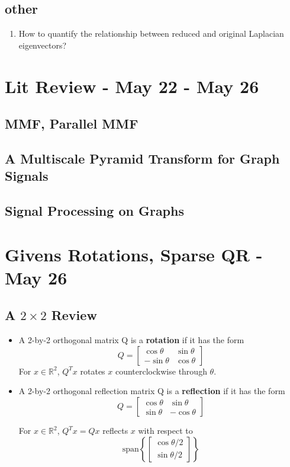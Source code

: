\documentclass[a4paper]{article}
\newcommand{\R}{\mathbb{R}}
\begin{document}
\subsection{other}
\begin{enumerate}
\item How to quantify the relationship between reduced and original Laplacian eigenvectors?
\end{enumerate}
\newpage
\section{Lit Review - May 22 - May 26}
\subsection{MMF, Parallel MMF}

\subsection{A Multiscale Pyramid Transform for Graph Signals}

\subsection{Signal Processing on Graphs}



\section{Givens Rotations, Sparse QR - May 26}

\subsection{A $2\times 2$ Review}
\begin{itemize}
\item A 2-by-2 orthogonal matrix Q is a \textbf{rotation} if it has the form 
\[
Q = \begin{bmatrix}
    \cos\theta & \sin\theta \\
    -\sin\theta & \cos\theta
\end{bmatrix}\]
For $x \in \R^2$, $Q^Tx$ rotates $x$ counterclockwise through $\theta$.

\item A 2-by-2 orthogonal reflection matrix Q is a \textbf{reflection} if it has the form 
\[
Q = \begin{bmatrix}
    \cos\theta & \sin\theta \\
    \sin\theta & -\cos\theta
\end{bmatrix}\]

For $x \in \R^2$, $Q^Tx = Qx$ reflects $x$ with respect to 
$$\text{span}\left \{\begin{bmatrix}
    \cos\theta/2 \\
    \sin\theta/2
\end{bmatrix}\right \}$$
\end{itemize}
\end{document}

